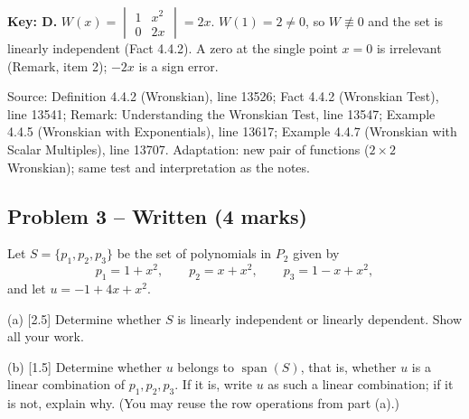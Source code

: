 \documentclass[11pt,a4paper]{article}
\newcommand{\Src}[1]{{\footnotesize\color{black!65}Source: #1}}
\begin{document}
\textbf{Key: D.} $W(x)=\begin{vmatrix}1&x^{2}\\0&2x\end{vmatrix}=2x$. $W(1)=2\neq0$, so $W\not\equiv0$ and the set is linearly independent (Fact 4.4.2). A zero at the single point $x=0$ is irrelevant (Remark, item 2); $-2x$ is a sign error.\par
\Src{Definition 4.4.2 (Wronskian), line 13526; Fact 4.4.2 (Wronskian Test), line 13541; Remark: Understanding the Wronskian Test, line 13547; Example 4.4.5 (Wronskian with Exponentials), line 13617; Example 4.4.7 (Wronskian with Scalar Multiples), line 13707. Adaptation: new pair of functions ($2\times2$ Wronskian); same test and interpretation as the notes.}\par
\subsection*{Problem 3 -- Written (4 marks)}
Let $S=\{p_1,p_2,p_3\}$ be the set of polynomials in $P_2$ given by\[p_1=1+x^{2},\qquad p_2=x+x^{2},\qquad p_3=1-x+x^{2},\]and let $u=-1+4x+x^{2}$.\par (a) [2.5] Determine whether $S$ is linearly independent or linearly dependent. Show all your work.\par (b) [1.5] Determine whether $u$ belongs to $\operatorname{span}(S)$, that is, whether $u$ is a linear combination of $p_1,p_2,p_3$. If it is, write $u$ as such a linear combination; if it is not, explain why. (You may reuse the row operations from part (a).)\par
\end{document}

